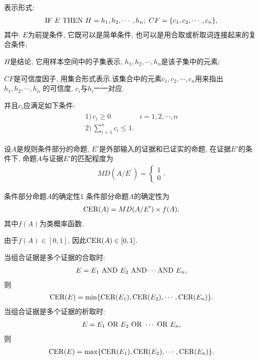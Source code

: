 表示形式:
\begin{align}
  \textup{IF}\,\,   E\,\,   \textup{THEN} \,\,   H={h_1, h_2, \cdots, h_n}; \,\, CF=\{c_1, c_2, \cdots, c_n\},
\end{align}
其中:
     $E$为前提条件, 它既可以是简单条件, 也可以是用合取或析取词连接起来的复合条件;

     $H$是结论, 它用样本空间中的子集表示,  $h_1, h_2, \cdots, h_n$是该子集中的元素;

     $CF$是可信度因子, 用集合形式表示.该集合中的元素$c_1, c_2, \cdots, c_n$用来指出$h_1, h_2, \cdots, h_n$ 的可信度, $c_i$与$h_i$一一对应.

 并且$c_i$应满足如下条件:
\begin{align}
 \begin{array}{ll}
   1)\, c_{i} \geq 0 & i=1,2, \cdots, n \\
   2)\, \sum_{i=1}^{n} c_{i} \leq 1.&
 \end{array}
\end{align}

\begin{example}
设$A$是规则条件部分的命题, $E'$是外部输入的证据和已证实的命题, 在证据$E'$的条件下, 命题$A$与证据$E'$的匹配程度为
\begin{align}
  MD\left(A / E^{\prime}\right)=
  \left\{
  \begin{array}{l}
  1 \\
  0\end{array}
  \right..
\end{align}
\end{example}

\begin{mydef}{条件部分命题$A$的确定性}{1}
条件部分命题$A$的确定性为
\begin{align}
  \textup{CER}(A)=MD(A/E')\times f(A),
\end{align}
其中$f(A)$为类概率函数.
\end{mydef}
由于$f(A) \in [0, 1]$, 因此$\textup{CER}(A)\in [0,  1]$.

当组合证据是多个证据的合取时:
\begin{align}
  E=E_1\,\,  \textup{AND}\,\,  E_2 \,\, \textup{AND} \cdots  \textup{AND} \,\,  E_n,
\end{align}
则
\begin{align}
  \textup{CER}(E)=\min\{\textup{CER}(E_1), \textup{CER}(E_2), \cdots,\textup{CER}(E_n)\}.
\end{align}
    当组合证据是多个证据的析取时:
\begin{align}
  E=E_1\,\, \textup{OR} \,\, E_2 \,\,  \textup{OR}\,\,\cdots \,\, \textup{OR}\,\,  E_n,
\end{align}
则
\begin{align}
  \textup{CER}(E)=\max\{\textup{CER}(E_1), \textup{CER}(E_2),\cdots, \textup{CER}(E_n)\}.
\end{align}

